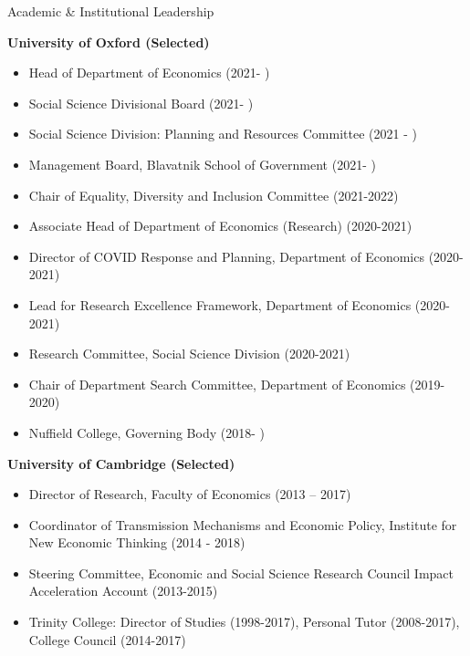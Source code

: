 \documentclass{resume} %
\begin{document}
\vspace{0.5cm}
\begin{rSection}{Academic \& Institutional Leadership}

\item \textbf{University of Oxford (Selected)}
\begin{itemize} 
\item Head of Department of Economics (2021- )
\item Social Science Divisional Board (2021- ) 
\item Social Science Division: Planning and Resources Committee (2021 - ) 
\item Management Board, Blavatnik School of Government (2021- )
\item Chair of Equality, Diversity and Inclusion Committee (2021-2022)
\item Associate Head of Department of Economics (Research) (2020-2021)
\item Director of COVID Response and Planning, Department of Economics (2020-2021)
\item Lead for Research Excellence Framework, Department of Economics (2020-2021) 
\item Research Committee, Social Science Division (2020-2021)
\item Chair of Department Search Committee, Department of Economics (2019-2020)  
\item Nuffield College, Governing Body (2018- )
\end{itemize}
\vspace{0.5cm}
\item \textbf{University of Cambridge (Selected)}
\begin{itemize} 
\item Director of Research, Faculty of Economics (2013 – 2017) 
\item Coordinator of Transmission Mechanisms and Economic Policy, Institute for New Economic Thinking (2014 - 2018)
\item Steering Committee, Economic and Social Science Research Council Impact Acceleration Account (2013-2015)
\item Trinity College: Director of Studies (1998-2017), Personal Tutor (2008-2017), College Council (2014-2017) 
\end{itemize}

\end{rSection}

\vspace{0.5cm}
\end{document}
